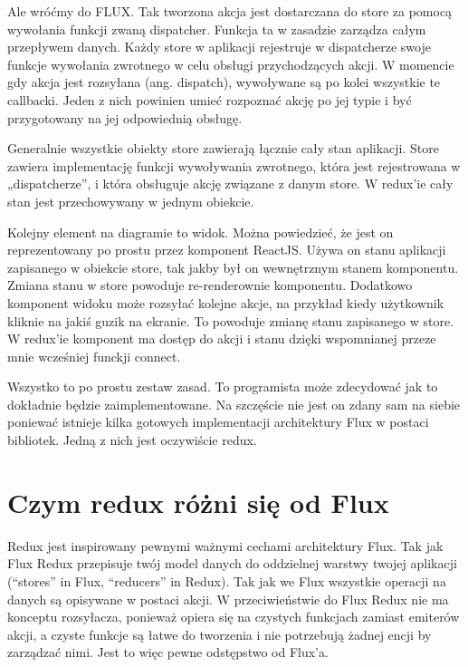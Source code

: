 Ale wróćmy do FLUX. Tak tworzona akcja jest dostarczana do store za pomocą wywołania funkcji zwaną dispatcher. Funkcja ta w zasadzie zarządza całym przepływem danych. Każdy store w aplikacji rejestruje w dispatcherze swoje funkcje wywołania zwrotnego w celu obsługi przychodzących akcji. W momencie gdy akcja jest rozsyłana (ang. dispatch), wywoływane są po kolei wszystkie te callbacki. Jeden z nich powinien umieć rozpoznać akcję po jej typie i być przygotowany na jej odpowiednią obsługę.

Generalnie wszystkie obiekty store zawierają łącznie cały stan aplikacji. Store zawiera implementację funkcji wywoływania zwrotnego, która jest rejestrowana w „dispatcherze”, i która obsługuje akcję związane z danym store.
W redux'ie cały stan jest przechowywany w jednym obiekcie.

Kolejny element na diagramie to widok. Można powiedzieć, że jest on reprezentowany po prostu przez komponent ReactJS. Używa on stanu aplikacji zapisanego w obiekcie store, tak jakby był on wewnętrznym stanem komponentu. Zmiana stanu w store powoduje re-renderownie komponentu. Dodatkowo komponent widoku może rozsyłać kolejne akcje, na przykład kiedy użytkownik kliknie na jakiś guzik na ekranie. To powoduje zmianę stanu zapisanego w store.
W redux'ie komponent ma dostęp do akcji i stanu dzięki wspomnianej przeze mnie wcześniej funckji connect.

Wszystko to po prostu zestaw zasad. To programista może zdecydować jak to dokładnie będzie zaimplementowane. Na szczęście nie jest on zdany sam na siebie poniewać istnieje kilka gotowych implementacji architektury Flux w postaci bibliotek.\cite{www_nafrontendzie}
Jedną z nich jest oczywiście redux.

\section{Czym redux różni się od Flux}

Redux jest inspirowany pewnymi ważnymi cechami architektury Flux. Tak jak Flux Redux przepisuje twój model danych do oddzielnej warstwy twojej aplikacji (“stores” in Flux, “reducers” in Redux). Tak jak we Flux wszystkie operacji na danych są opisywane w postaci akcji. W przeciwieństwie do Flux Redux nie ma konceptu rozsyłacza, ponieważ opiera się na czystych funkcjach zamiast emiterów akcji, a czyste funkcje są łatwe do tworzenia i nie potrzebują żadnej encji by zarządzać nimi. Jest to więc pewne odstępstwo od Flux’a. 

